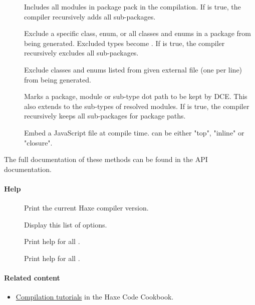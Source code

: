 \begin{description}
	\item[] 
		Includes all modules in package pack in the compilation.  If  is true, the compiler recursively adds all sub-packages.
	\item[] 
		Exclude a specific class, enum, or all classes and enums in a package from being generated. Excluded types become . If  is true, the compiler recursively excludes all sub-packages.
	\item[] 
		Exclude classes and enums listed from given external file (one per line) from being generated.
	\item[] 
		Marks a package, module or sub-type dot path to be kept by DCE. This also extends to the sub-types of resolved modules. If  is true, the compiler recursively keeps all sub-packages for package paths.
	\item[] 
		Embed a JavaScript file at compile time.  can be either "top", "inline" or "closure".  
\end{description}

The full documentation of these methods can be found in the \href{http://api.haxe.org/haxe/macro/Compiler.html}{} API documentation.

\paragraph{Help}

\begin{description}
	\item[] Print the current Haxe compiler version.
	\item[] Display this list of options.
	\item[] Print help for all .
	\item[] Print help for all .
\end{description}

\paragraph{Related content}
\begin{itemize}
	\item \href{http://code.haxe.org/category/compilation/}{Compilation tutorials} in the Haxe Code Cookbook.
\end{itemize}


